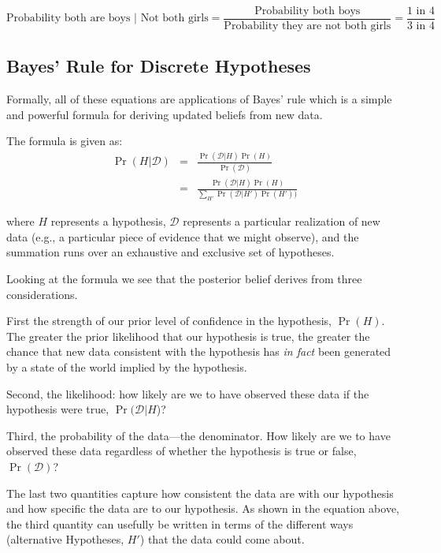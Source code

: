 \documentclass[
  12pt,
]{book}
\begin{document}
\[\text{Probability both are boys | Not both girls} = \frac{\text{Probability  both boys}}{\text{Probability they are not both girls}} = \frac{\text{1 in 4}}{\text{3 in 4}}\]

\hypertarget{bayes-rule-for-discrete-hypotheses}{%
\subsection{Bayes' Rule for Discrete Hypotheses}\label{bayes-rule-for-discrete-hypotheses}}

Formally, all of these equations are applications of Bayes' rule which is a simple and powerful formula for deriving updated beliefs from new data.

The formula is given as:
\begin{eqnarray}
\Pr(H|\mathcal{D})&=&\frac{\Pr(\mathcal{D}|H)\Pr(H)}{\Pr(\mathcal{D})}\\
                  &=&\frac{\Pr(\mathcal{D}|H)\Pr(H)}{\sum_{H'}\Pr(\mathcal{D}|H')\Pr(H'))}
\end{eqnarray}

where \(H\) represents a hypothesis, \(\mathcal{D}\) represents a particular realization of new data (e.g., a particular piece of evidence that we might observe), and the summation runs over an exhaustive and exclusive set of hypotheses.

Looking at the formula we see that the posterior belief derives from three considerations.

First the strength of our prior level of confidence in the hypothesis, \(\Pr(H)\). The greater the prior likelihood that our hypothesis is true, the greater the chance that new data consistent with the hypothesis has \emph{in fact} been generated by a state of the world implied by the hypothesis.

Second, the likelihood: how likely are we to have observed these data if the hypothesis were true, \(\Pr(\mathcal{D}|H\))?

Third, the probability of the data---the denominator. How likely are we to have observed these data regardless of whether the hypothesis is true or false, \(\Pr(\mathcal{D})\)?

The last two quantities capture how consistent the data are with our hypothesis and how specific the data are to our hypothesis. As shown in the equation above, the third quantity can usefully be written in terms of the different ways (alternative Hypotheses, \(H'\)) that the data could come about.
\end{document}
